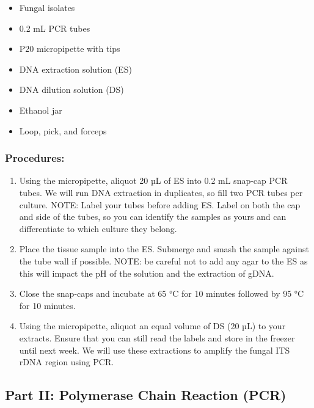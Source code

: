 \documentclass[
  letterpaper,
  DIV=11,
  numbers=noendperiod]{scrreprt}
\providecommand{\tightlist}{%
  \setlength{\itemsep}{0pt}\setlength{\parskip}{0pt}}
\begin{document}
\begin{itemize}
\tightlist
\item
  Fungal isolates
\item
  0.2 mL PCR tubes
\item
  P20 micropipette with tips
\item
  DNA extraction solution (ES)
\item
  DNA dilution solution (DS)
\item
  Ethanol jar
\item
  Loop, pick, and forceps
\end{itemize}

\subsubsection*{Procedures:}\label{procedures}

\begin{enumerate}
\def\labelenumi{\arabic{enumi}.}
\tightlist
\item
  Using the micropipette, aliquot 20 µL of ES into 0.2 mL snap-cap PCR
  tubes. We will run DNA extraction in duplicates, so fill two PCR tubes
  per culture. NOTE: Label your tubes before adding ES. Label on both
  the cap and side of the tubes, so you can identify the samples as
  yours and can differentiate to which culture they belong.
\item
  Place the tissue sample into the ES. Submerge and smash the sample
  against the tube wall if possible. NOTE: be careful not to add any
  agar to the ES as this will impact the pH of the solution and the
  extraction of gDNA.
\item
  Close the snap-caps and incubate at 65 °C for 10 minutes followed by
  95 °C for 10 minutes.
\item
  Using the micropipette, aliquot an equal volume of DS (20 µL) to your
  extracts. Ensure that you can still read the labels and store in the
  freezer until next week. We will use these extractions to amplify the
  fungal ITS rDNA region using PCR.
\end{enumerate}

\subsection*{Part II: Polymerase Chain Reaction
(PCR)}\label{part-ii-polymerase-chain-reaction-pcr}
\end{document}
